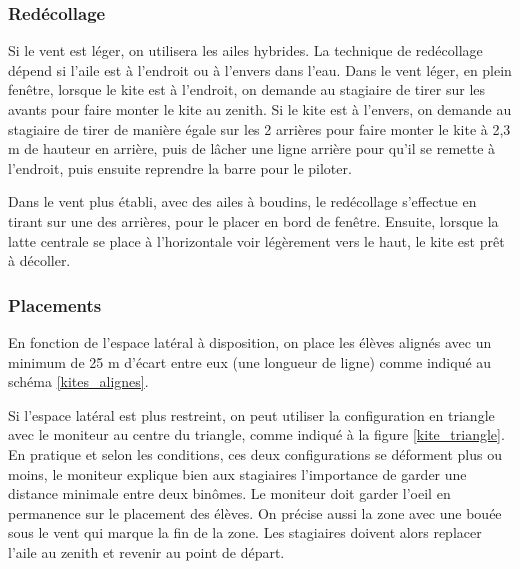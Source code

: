 \documentclass[11pt,a4paper]{report}
\begin{document}
\subsubsection{Redécollage}
Si le vent est léger, on utilisera les ailes hybrides. La technique
de redécollage dépend si l'aile est à l'endroit ou à l'envers dans l'eau.
Dans le vent léger, en plein fen\^etre, lorsque
le kite est à l'endroit, on demande au stagiaire de tirer  sur les avants
pour faire monter le kite au zenith. 
Si le kite est à l'envers, on demande au stagiaire de tirer de manière
égale sur les 2 arrières pour faire monter le kite à 2,3 m de hauteur en arrière, 
puis de lâcher une ligne arrière pour qu'il se remette à l'endroit, puis ensuite 
reprendre la barre pour le piloter.

Dans le vent plus établi, avec des ailes à boudins, le redécollage s'effectue
en tirant sur une des arrières, pour le placer en bord de fenêtre.
Ensuite, lorsque la latte centrale se place à l'horizontale voir légèrement vers
le haut, le kite est pr\^et à décoller.

\subsubsection{Placements}
En fonction de l'espace latéral à disposition, on place les élèves
alignés avec un minimum de 25 m d'écart entre eux (une longueur de ligne) 
comme indiqué au schéma \ref{kites_alignes}.

Si l'espace latéral est plus restreint, on peut utiliser la configuration
en triangle avec le moniteur au centre du triangle, comme indiqué à la figure
\ref{kite_triangle}.
En pratique et selon les conditions, ces deux configurations se déforment plus ou moins, 
le moniteur explique bien aux stagiaires l'importance de garder une distance minimale 
entre deux binômes. Le moniteur doit garder l'oeil en permanence sur le
placement des élèves. On précise aussi la zone avec une bouée sous le vent qui marque
la fin de la zone. Les stagiaires doivent alors replacer l'aile au zenith et 
revenir au point de départ.
\end{document}
